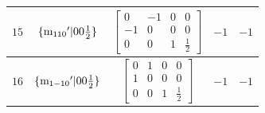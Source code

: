 \documentclass[fleqn,8pt]{jsarticle}
\begin{document}
\begin{longtable}{ccccc}
$ 15 $ & $ \{{\rm m}_{110}{}'|0 0 \frac{1}{2}\} $ & $ \begin{bmatrix} 0 & -1 & 0 & 0 \\ -1 & 0 & 0 & 0 \\ 0 & 0 & 1 & \frac{1}{2} \end{bmatrix} $ & $ -1 $ & $ -1 $ \\ \hline
$ 16 $ & $ \{{\rm m}_{1-10}{}'|0 0 \frac{1}{2}\} $ & $ \begin{bmatrix} 0 & 1 & 0 & 0 \\ 1 & 0 & 0 & 0 \\ 0 & 0 & 1 & \frac{1}{2} \end{bmatrix} $ & $ -1 $ & $ -1 $ \\
\end{longtable}
\end{document}
